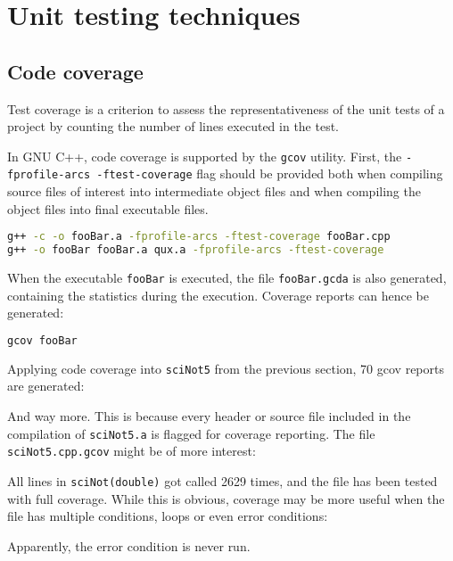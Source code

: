 \section{Unit testing techniques}
\subsection{Code coverage}
Test coverage is a criterion to assess the representativeness of the unit tests of a project by counting the number of lines executed in the test.

In GNU C++, code coverage is supported by the \texttt{gcov} utility.
First, the \texttt{-fprofile-arcs -ftest-coverage} flag should be provided both
when compiling source files of interest into intermediate object files
and when compiling the object files into final executable files.

\begin{lstlisting}[style=Cpp, language=bash]
g++ -c -o fooBar.a -fprofile-arcs -ftest-coverage fooBar.cpp
g++ -o fooBar fooBar.a qux.a -fprofile-arcs -ftest-coverage
\end{lstlisting}

When the executable \texttt{fooBar} is executed, the file \texttt{fooBar.gcda} is also generated,
containing the statistics during the execution. Coverage reports can hence be generated:

\begin{lstlisting}[style=Cpp, language=bash]
gcov fooBar
\end{lstlisting}

Applying code coverage into \texttt{sciNot5} from the previous section, 70 gcov reports are generated:



And way more. This is because every header or source file included in the compilation of \texttt{sciNot5.a}
is flagged for coverage reporting. The file \texttt{sciNot5.cpp.gcov} might be of more interest:


All lines in \texttt{sciNot(double)} got called 2629 times, and the file has been tested with full coverage.
While this is obvious, coverage may be more useful when the file has multiple conditions, loops or even error conditions:


Apparently, the error condition is never run.

